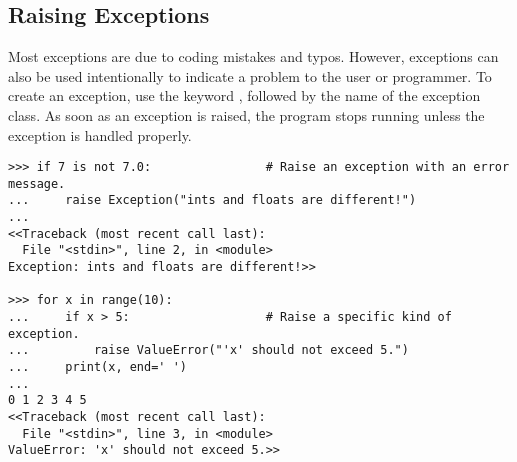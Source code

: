 \subsection*{Raising Exceptions} %

Most exceptions are due to coding mistakes and typos.
However, exceptions can also be used intentionally to indicate a problem to the user or programmer.
To create an exception, use the keyword , followed by the name of the exception class.
As soon as an exception is raised, the program stops running unless the exception is handled properly.


\begin{lstlisting}
>>> if 7 is not 7.0:                # Raise an exception with an error message.
...     raise Exception("ints and floats are different!")
...
<<Traceback (most recent call last):
  File "<stdin>", line 2, in <module>
Exception: ints and floats are different!>>

>>> for x in range(10):
...     if x > 5:                   # Raise a specific kind of exception.
...         raise ValueError("'x' should not exceed 5.")
...     print(x, end=' ')
...
0 1 2 3 4 5
<<Traceback (most recent call last):
  File "<stdin>", line 3, in <module>
ValueError: 'x' should not exceed 5.>>
\end{lstlisting}

